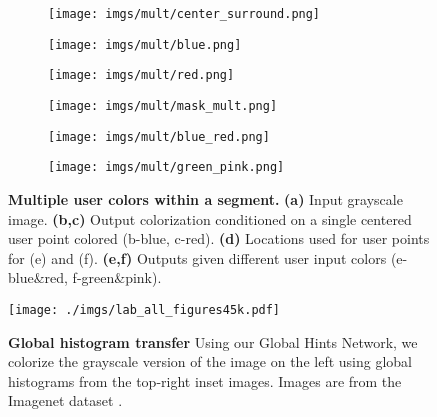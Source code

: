 \documentclass[acmtog,authorversion]{acmart}
\begin{document}
\begin{figure}[t!]
    \centering
    \begin{subfigure}[t]{0.075\textwidth}
        \centering
        \texttt{[image: imgs/mult/center\_surround.png]}
        \caption{}
    \end{subfigure}
    \begin{subfigure}[t]{0.075\textwidth}
        \centering
        \texttt{[image: imgs/mult/blue.png]}
        \caption{}
    \end{subfigure}
    \begin{subfigure}[t]{0.075\textwidth}
        \centering
        \texttt{[image: imgs/mult/red.png]}    
        \caption{}
    \end{subfigure}
    \begin{subfigure}[t]{0.075\textwidth}
        \centering
        \texttt{[image: imgs/mult/mask\_mult.png]}
        \caption{}
    \end{subfigure}
    \begin{subfigure}[t]{0.075\textwidth}
        \centering
        \texttt{[image: imgs/mult/blue\_red.png]}  
        \caption{}
    \end{subfigure}
    \begin{subfigure}[t]{0.075\textwidth}
        \centering
        \texttt{[image: imgs/mult/green\_pink.png]}  
        \caption{}
    \end{subfigure}
    \vspace{-3mm}
    \caption{\textbf{Multiple user colors within a segment.} \textbf{(a)} Input grayscale image. \textbf{(b,c)} Output colorization conditioned on a single centered user point colored (b-blue, c-red). \textbf{(d)} Locations used for user points for (e) and (f). \textbf{(e,f)} Outputs given different user input colors (e-blue\&red, f-green\&pink).}
    \label{fig:mult}
    \vspace{-6mm}
\end{figure}

\begin{figure*}[t!]
\texttt{[image: ./imgs/lab\_all\_figures45k.pdf]}
\vspace{-6mm}
\caption{\textbf{Global histogram transfer} Using our Global Hints Network, we colorize the grayscale version of the image on the left using global histograms from the top-right inset images. Images are from the Imagenet dataset \cite{russakovsky2015imagenet}.}
\label{fig:bird_figure}
\end{figure*}
\end{document}
